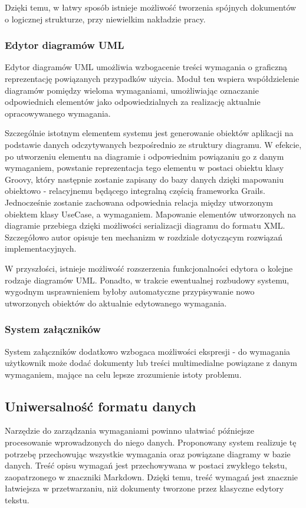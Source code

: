      Dzięki temu, w łatwy sposób istnieje możliwość tworzenia spójnych dokumentów o logicznej strukturze, przy niewielkim nakładzie pracy.

      \subsubsection{Edytor diagramów UML}

      Edytor diagramów UML umożliwia wzbogacenie treści wymagania o graficzną reprezentację powiązanych przypadków użycia. Moduł ten wspiera współdzielenie diagramów pomiędzy wieloma wymaganiami, umożliwiając oznaczanie odpowiednich elementów jako odpowiedzialnych za realizację aktualnie opracowywanego wymagania. 

      Szczególnie istotnym elementem systemu jest generowanie obiektów aplikacji na podstawie danych odczytywanych bezpośrednio ze struktury diagramu. W efekcie, po utworzeniu elementu na diagramie i odpowiednim powiązaniu go z danym wymaganiem, powstanie reprezentacja tego elementu w postaci obiektu klasy Groovy, który następnie zostanie zapisany do bazy danych dzięki mapowaniu obiektowo - relacyjnemu będącego integralną częścią frameworka Grails. Jednocześnie zostanie zachowana odpowiednia relacja między utworzonym obiektem klasy UseCase, a wymaganiem. Mapowanie elementów utworzonych na diagramie przebiega dzięki możliwości serializacji diagramu do formatu XML. Szczegółowo autor opisuje ten mechanizm w rozdziale dotyczącym rozwiązań implementacyjnych.

      W przyszłości, istnieje możliwość rozszerzenia funkcjonalności edytora o kolejne rodzaje diagramów UML. Ponadto, w trakcie ewentualnej rozbudowy systemu, wygodnym usprawnieniem byłoby automatyczne przypisywanie nowo utworzonych obiektów do aktualnie edytowanego wymagania.

      \subsubsection{System załączników}

      System załączników dodatkowo wzbogaca możliwości ekspresji - do wymagania użytkownik może dodać dokumenty lub treści multimedialne powiązane z danym wymaganiem, mające na celu lepsze zrozumienie istoty problemu.

    \subsection{Uniwersalność formatu danych}
      Narzędzie do zarządzania wymaganiami powinno ułatwiać późniejsze procesowanie wprowadzonych do niego danych. Proponowany system realizuje tę potrzebę przechowując wszystkie wymagania oraz powiązane diagramy w bazie danych. Treść opisu wymagań jest przechowywana w postaci zwykłego tekstu, zaopatrzonego w znaczniki Markdown. Dzięki temu, treść wymagań jest znacznie łatwiejsza w przetwarzaniu, niż dokumenty tworzone przez klasyczne edytory tekstu.
      
